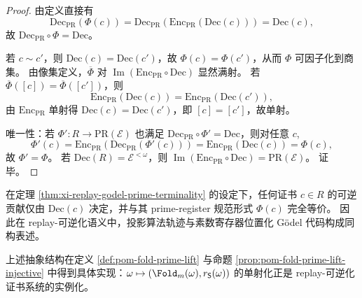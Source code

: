 \begin{proof}
由定义直接有
\[
\mathrm{Dec}_{\mathrm{PR}}(\Phi(c))
=
\mathrm{Dec}_{\mathrm{PR}}\!\left(\mathrm{Enc}_{\mathrm{PR}}(\mathrm{Dec}(c))\right)
=
\mathrm{Dec}(c),
\]
故 \(\mathrm{Dec}_{\mathrm{PR}}\circ\Phi=\mathrm{Dec}\)。

若 \(c\sim c'\)，则 \(\mathrm{Dec}(c)=\mathrm{Dec}(c')\)，故 \(\Phi(c)=\Phi(c')\)，从而 \(\Phi\) 可因子化到商集。
由像集定义，\(\overline\Phi\) 对 \(\operatorname{Im}(\mathrm{Enc}_{\mathrm{PR}}\circ\mathrm{Dec})\) 显然满射。
若 \(\overline\Phi([c])=\overline\Phi([c'])\)，则
\[
\mathrm{Enc}_{\mathrm{PR}}(\mathrm{Dec}(c))
=
\mathrm{Enc}_{\mathrm{PR}}(\mathrm{Dec}(c')),
\]
由 \(\mathrm{Enc}_{\mathrm{PR}}\) 单射得 \(\mathrm{Dec}(c)=\mathrm{Dec}(c')\)，即 \([c]=[c']\)，故单射。

唯一性：若 \(\Phi':R\to\mathrm{PR}(\mathcal E)\) 也满足 \(\mathrm{Dec}_{\mathrm{PR}}\circ\Phi'=\mathrm{Dec}\)，则对任意 \(c\),
\[
\Phi'(c)
=
\mathrm{Enc}_{\mathrm{PR}}\!\left(\mathrm{Dec}_{\mathrm{PR}}(\Phi'(c))\right)
=
\mathrm{Enc}_{\mathrm{PR}}(\mathrm{Dec}(c))
=
\Phi(c),
\]
故 \(\Phi'=\Phi\)。
若 \(\mathrm{Dec}(R)=\mathcal E^{<\omega}\)，则
\(\operatorname{Im}(\mathrm{Enc}_{\mathrm{PR}}\circ\mathrm{Dec})=\mathrm{PR}(\mathcal E)\)。
证毕。
\end{proof}

\begin{corollary}[算法--素数确定性]\label{cor:xi-replay-algorithm-prime-determinism}
在定理 \ref{thm:xi-replay-godel-prime-terminality} 的设定下，任何证书 \(c\in R\) 的可逆贡献仅由 \(\mathrm{Dec}(c)\) 决定，并与其 prime-register 规范形式 \(\Phi(c)\) 完全等价。
因此在 replay-可逆化语义中，投影算法轨迹与素数寄存器位置化 Gödel 代码构成同构表述。
\end{corollary}

\begin{remark}[与折叠系统实现的对齐]\label{rem:xi-replay-godel-prime-alignment-fold}
上述抽象结构在定义 \ref{def:pom-fold-prime-lift} 与命题 \ref{prop:pom-fold-prime-lift-injective} 中得到具体实现：\(\omega\mapsto(\Fold_m(\omega),r_{\mathsf S}(\omega))\) 的单射化正是 replay-可逆化证书系统的实例化。
\end{remark}




